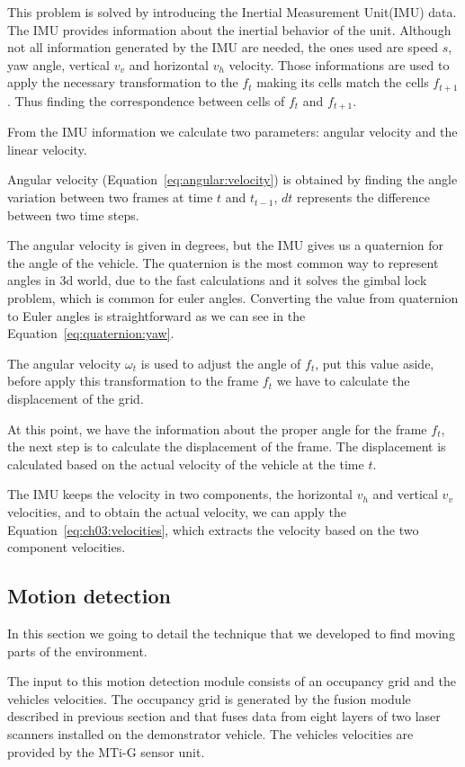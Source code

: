 This problem is solved by introducing the Inertial Measurement Unit(IMU) data. The IMU provides information about the inertial behavior of the unit. Although not all information generated by the IMU are needed, the ones used are speed $s$, yaw angle, vertical $v_v$ and horizontal $v_h$ velocity. Those informations are used to apply the necessary transformation to the $f_t$ making its cells match the cells $f_{t+1}$. Thus finding the correspondence between cells of $f_t$ and $f_{t+1}$.

From the IMU information we calculate two parameters: angular velocity and the linear velocity. 

Angular velocity (Equation~\ref{eq:angular:velocity}) is obtained by finding the angle variation between two frames at time $t$ and $t_{t-1}$, $dt$ represents the difference between two time steps.

The angular velocity is given in degrees, but the IMU gives us a quaternion for the angle of the vehicle. The quaternion is the most common way to represent angles in 3d world, due to the fast calculations and it solves the gimbal lock problem, which is common for euler angles. Converting the value from quaternion to Euler angles is straightforward as we can see in the Equation~\ref{eq:quaternion:yaw}.

The angular velocity $\omega_t$ is used to adjust the angle of $f_t$, put this value aside, before apply this transformation to the frame $f_t$ we have to calculate the displacement of the grid.

At this point, we have the information about the proper angle for the frame $f_t$, the next step is to calculate the displacement of the frame. The displacement is calculated based on the actual velocity of the vehicle at the time $t$. 

The IMU keeps the velocity in two components, the horizontal $v_h$ and vertical $v_v$ velocities, and to obtain the actual velocity, we can apply the Equation~\ref{eq:ch03:velocities}, which extracts the velocity based on the two component velocities.


\subsection{Motion detection}
\label{ch03:motiondetection}

In this section we going to detail the technique that we developed to find moving parts of the environment. 

The input to this motion detection module consists of an occupancy grid and the vehicles velocities. The occupancy grid is generated by the fusion module described in previous section and that fuses data from eight layers of two laser scanners installed on the demonstrator vehicle. The vehicles velocities are provided by the MTi-G sensor unit.

